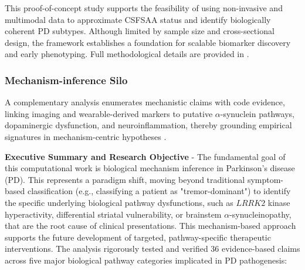 \documentclass[11pt]{article}
\begin{document}
This proof-of-concept study supports the feasibility of using non-invasive and multimodal data to approximate CSFSAA status and identify biologically coherent PD subtypes. Although limited by sample size and cross-sectional design, the framework establishes a foundation for scalable biomarker discovery and early phenotyping. Full methodological details are provided in \cite{khalil2025multimodal}.



\subsubsection{Mechanism-inference Silo}
A complementary analysis enumerates mechanistic claims with code evidence, linking imaging and wearable-derived markers to putative $\alpha$-synuclein pathways, dopaminergic dysfunction, and neuroinflammation, thereby grounding empirical signatures in mechanism-centric hypotheses \cite{tirhekar2025comprehensive}.

\textbf{Executive Summary and Research Objective} - 
The fundamental goal of this computational work is biological mechanism inference in Parkinson’s disease (PD). This represents a paradigm shift, moving beyond traditional symptom-based classification (e.g., classifying a patient as "tremor-dominant") to identify the specific underlying biological pathway dysfunctions, such as $LRRK2$ kinase hyperactivity, differential striatal vulnerability, or brainstem $\alpha$-synucleinopathy, that are the root cause of clinical presentations. This mechanism-based approach supports the future development of targeted, pathway-specific therapeutic interventions.
The analysis rigorously tested and verified 36 evidence-based claims across five major biological pathway categories implicated in PD pathogenesis:
\end{document}
